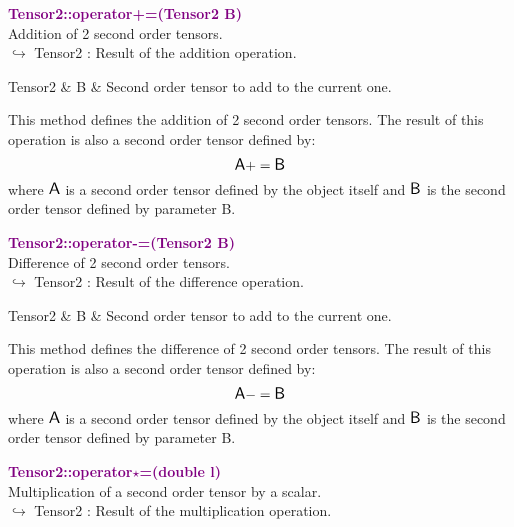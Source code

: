 \textcolor{purple}{\textbf{Tensor2::operator+=(Tensor2 B)}}\label{Tensor2::operator+=(Tensor2 B)}\\
Addition of 2 second order tensors.\\ \hspace*{10mm}$\hookrightarrow$ Tensor2 : Result of the addition operation.

\begin{tcolorbox}[width=\textwidth,myArgs,tabularx={ll|R}]
Tensor2 & B & Second order tensor to add to the current one.
\end{tcolorbox}

This method defines the addition of 2 second order tensors.
The result of this operation is also a second order tensor defined by:
\begin{equation*}
\mbox{\large\ensuremath{\mathsf{A}}} += \mbox{\large\ensuremath{\mathsf{B}}}
\end{equation*}
where $\mbox{\large\ensuremath{\mathsf{A}}}$ is a second order tensor defined by the object itself and $\mbox{\large\ensuremath{\mathsf{B}}}$ is the second order tensor defined by parameter B.

\textcolor{purple}{\textbf{Tensor2::operator-=(Tensor2 B)}}\label{Tensor2::operator-=(Tensor2 B)}\\
Difference of 2 second order tensors.\\ \hspace*{10mm}$\hookrightarrow$ Tensor2 : Result of the difference operation.

\begin{tcolorbox}[width=\textwidth,myArgs,tabularx={ll|R}]
Tensor2 & B & Second order tensor to add to the current one.
\end{tcolorbox}

This method defines the difference of 2 second order tensors.
The result of this operation is also a second order tensor defined by:
\begin{equation*}
\mbox{\large\ensuremath{\mathsf{A}}} -= \mbox{\large\ensuremath{\mathsf{B}}}
\end{equation*}
where $\mbox{\large\ensuremath{\mathsf{A}}}$ is a second order tensor defined by the object itself and $\mbox{\large\ensuremath{\mathsf{B}}}$ is the second order tensor defined by parameter B.

\textcolor{purple}{\textbf{Tensor2::operator$\star$=(double l)}}\label{Tensor2::operator*=(double l)}\\
Multiplication of a second order tensor by a scalar.\\ \hspace*{10mm}$\hookrightarrow$ Tensor2 : Result of the multiplication operation.

